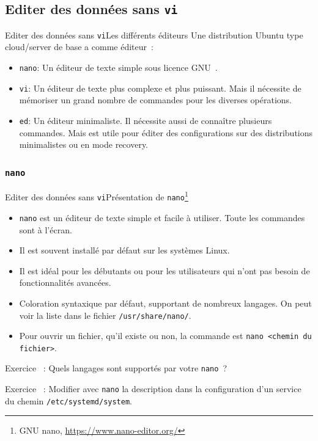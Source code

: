 \documentclass{beamer}
\begin{document}
    \subsection{Editer des données sans \lstinline{vi}}\label{subsec:edit-whithout-vi}


    \begin{frame}{Editer des données sans \lstinline{vi}}{Les différents éditeurs}
        Une distribution Ubuntu type cloud/server de base a comme éditeur~:
        \begin{itemize}
            \item \lstinline{nano}: Un éditeur de texte simple sous licence GNU~.
            \item \lstinline{vi}: Un éditeur de texte plus complexe et plus puissant.
            Mais il nécessite de mémoriser un grand nombre de commandes pour les diverses opérations.
            \item \lstinline{ed}: Un éditeur minimaliste.
            Il nécessite aussi de connaître plusieurs commandes.
            Mais est utile pour éditer des configurations sur des distributions minimalistes ou en mode recovery.
        \end{itemize}
    \end{frame}

    \subsubsection{\lstinline{nano}}\label{subsubsec:nano}
    \begin{frame}{Editer des données sans \lstinline{vi}}{Présentation de \lstinline{nano}\footnote{\label{nano}GNU nano, \url{https://www.nano-editor.org/}}}
        \begin{itemize}
            \item \lstinline{nano} est un éditeur de texte simple et facile à utiliser.
            Toute les commandes sont à l'écran.
            \item Il est souvent installé par défaut sur les systèmes Linux.
            \item Il est idéal pour les débutants ou pour les utilisateurs qui n'ont pas besoin de fonctionnalités avancées.
            \item Coloration syntaxique par défaut, supportant de nombreux langages.
            On peut voir la liste dans le fichier \lstinline{/usr/share/nano/}.
            \item Pour ouvrir un fichier, qu'il existe ou non, la commande est \lstinline{nano <chemin du fichier>}.
        \end{itemize}
        Exercice \execcounterdispinc~: Quels langages sont supportés par votre \lstinline{nano}~?

        Exercice \execcounterdispinc~: Modifier avec \lstinline{nano} la description dans la configuration d'un service du chemin \lstinline{/etc/systemd/system}.
    \end{frame}
\end{document}
